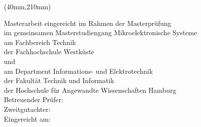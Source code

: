 %
%
\newpage
\thispagestyle{empty}
{\selectfont
  \hfuzz=20pt       %

  \vspace*{1cm}
  \begin{minipage}[b]{\textwidth}
    \fontsize{14pt}{20pt}
    \selectfont
    \begin{center}
      \IthesisAuthor
    \end{center}
  \end{minipage}

  \vspace{1.5cm}
  \begin{minipage}[b][0cm][t]{\textwidth}
    \fontsize{18pt}{20pt}
    \selectfont
    \begin{center}
      \IthesisTitle
  	\end{center}
  \end{minipage}

  \begin{textblock*}{\textwidth}(40mm,210mm)
    \begin{minipage}[b]{\textwidth}
      \selectfont
      \fontsize{12pt}{14pt}
      \selectfont
      Masterarbeit eingereicht im Rahmen der Masterprüfung \\
      im gemeinsamen Masterstudiengang Mikroelektronische Systeme\\
      am Fachbereich Technik\\
      der Fachhochschule Westküste\\
      und\\
      am Department Informations- und Elektrotechnik\\
      der Fakultät Technik und Informatik\\
      der Hochschule für Angewandte Wissenschaften Hamburg\\

      Betreuender Prüfer: \IfirstSv \\
      Zweitgutachter: \IsecondSv \\

      Eingereicht am: \ISubDate \\
    \end{minipage}
  \end{textblock*}
}
